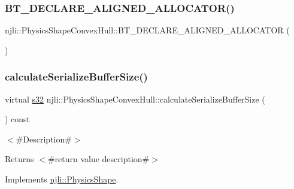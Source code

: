 \subsubsection{\texorpdfstring{B\+T\+\_\+\+D\+E\+C\+L\+A\+R\+E\+\_\+\+A\+L\+I\+G\+N\+E\+D\+\_\+\+A\+L\+L\+O\+C\+A\+T\+O\+R()}{BT\_DECLARE\_ALIGNED\_ALLOCATOR()}}
{\footnotesize\ttfamily njli\+::\+Physics\+Shape\+Convex\+Hull\+::\+B\+T\+\_\+\+D\+E\+C\+L\+A\+R\+E\+\_\+\+A\+L\+I\+G\+N\+E\+D\+\_\+\+A\+L\+L\+O\+C\+A\+T\+OR (\begin{DoxyParamCaption}{ }\end{DoxyParamCaption})\hspace{0.3cm}{\ttfamily [protected]}}

\mbox{\label{classnjli_1_1_physics_shape_convex_hull_aa9ec0cd740c7401ec7aefc8329b72ce1}} 
\subsubsection{\texorpdfstring{calculate\+Serialize\+Buffer\+Size()}{calculateSerializeBufferSize()}}
{\footnotesize\ttfamily virtual \mbox{\hyperlink{_util_8h_aa62c75d314a0d1f37f79c4b73b2292e2}{s32}} njli\+::\+Physics\+Shape\+Convex\+Hull\+::calculate\+Serialize\+Buffer\+Size (\begin{DoxyParamCaption}{ }\end{DoxyParamCaption}) const\hspace{0.3cm}{\ttfamily [virtual]}}

$<$\#\+Description\#$>$

\begin{DoxyReturn}{Returns}
$<$\#return value description\#$>$ 
\end{DoxyReturn}


Implements \mbox{\hyperlink{classnjli_1_1_physics_shape_a0612a1c8c3f4520d78cb7f5838f03074}{njli\+::\+Physics\+Shape}}.

\mbox{\label{classnjli_1_1_physics_shape_convex_hull_a56c1bfac52ff878caaa4548b4dd7c20c}} 
